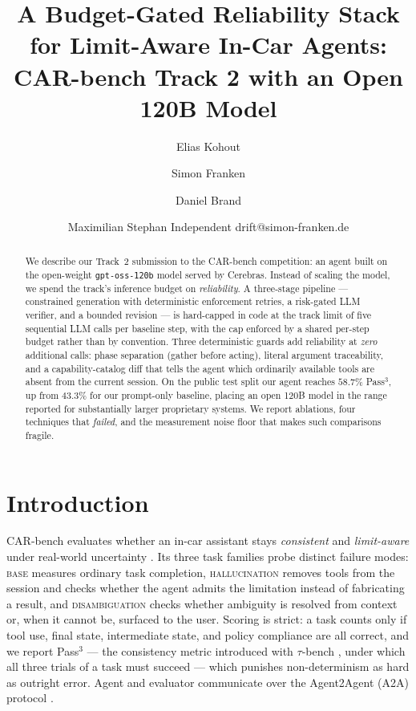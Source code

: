\documentclass{article}
\title{A Budget-Gated Reliability Stack for Limit-Aware In-Car Agents:\\
CAR-bench Track 2 with an Open 120B Model}
\author{
Elias Kohout
\and
Simon Franken
\and
Daniel Brand
\and
Maximilian Stephan
\affiliations
Independent
\emails
drift@simon-franken.de
}
\begin{document}
\maketitle

\begin{abstract}
We describe our Track~2 submission to the CAR-bench competition: an
agent built on the open-weight \texttt{gpt-oss-120b} model served by
Cerebras. Instead of scaling the model, we spend the track's inference
budget on \emph{reliability}. A three-stage pipeline --- constrained
generation with deterministic enforcement retries, a risk-gated LLM
verifier, and a bounded revision --- is hard-capped in code at the
track limit of five sequential LLM calls per baseline step, with the
cap enforced by a shared per-step budget rather than by convention.
Three deterministic guards add reliability at \emph{zero} additional
calls: phase separation (gather before acting), literal argument
traceability, and a capability-catalog diff that tells the agent which
ordinarily available tools are absent from the current session. On the
public test split our agent reaches $58.7\%$ Pass$^3$, up from $43.3\%$
for our prompt-only baseline, placing an open 120B model in the range
reported for substantially larger proprietary systems. We report
ablations, four techniques that \emph{failed}, and the measurement
noise floor that makes such comparisons fragile.
\end{abstract}

\section{Introduction}

CAR-bench evaluates whether an in-car assistant stays \emph{consistent}
and \emph{limit-aware} under real-world uncertainty
\cite{kirmayr2026carbench}. Its three task families probe distinct
failure modes: \textsc{base} measures ordinary task completion,
\textsc{hallucination} removes tools from the session and checks
whether the agent admits the limitation instead of fabricating a
result, and \textsc{disambiguation} checks whether ambiguity is
resolved from context or, when it cannot be, surfaced to the user.
Scoring is strict: a task counts only if tool use, final state,
intermediate state, and policy compliance are all correct, and we
report Pass$^3$ --- the consistency metric introduced with
$\tau$-bench \cite{yao2024taubench}, under which all three trials of a
task must succeed --- which punishes non-determinism as hard as
outright error. Agent and evaluator communicate over the Agent2Agent
(A2A) protocol \cite{a2a2026}.
\end{document}
